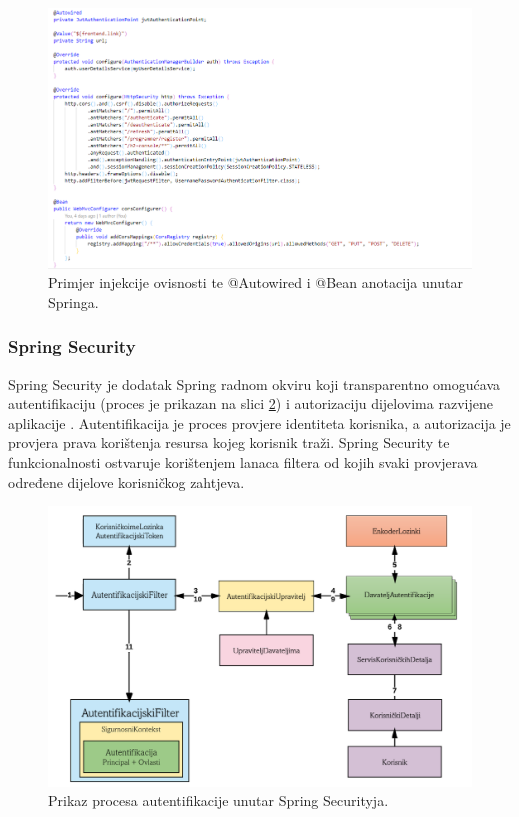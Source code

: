 \documentclass[times, utf8, zavrsni, numeric]{fer}
\begin{document}
			\begin{figure}[H]
				\centering
				\includegraphics[width=\linewidth]{pictures/prikazi/Spring.png}
				\caption{Primjer injekcije ovisnosti te @Autowired i @Bean anotacija unutar Springa.}
				\label{fig:spring}
			\end{figure}
			
			\subsubsection{Spring Security}
			Spring Security je dodatak Spring radnom okviru koji transparentno omogućava autentifikaciju  (proces je prikazan na slici \ref{fig:springsec}) i autorizaciju  dijelovima razvijene aplikacije . Autentifikacija je proces provjere identiteta korisnika, a autorizacija je provjera prava korištenja resursa kojeg korisnik traži. Spring Security te funkcionalnosti ostvaruje korištenjem lanaca filtera  od kojih svaki provjerava određene dijelove korisničkog zahtjeva.
			\begin{figure}[H]
				\centering
				\includegraphics[width=\linewidth]{pictures/prikazi/SpringSecurity.png}
				\caption{Prikaz procesa autentifikacije unutar Spring Securityja.}
				\label{fig:springsec}
			\end{figure}
			
\end{document}

